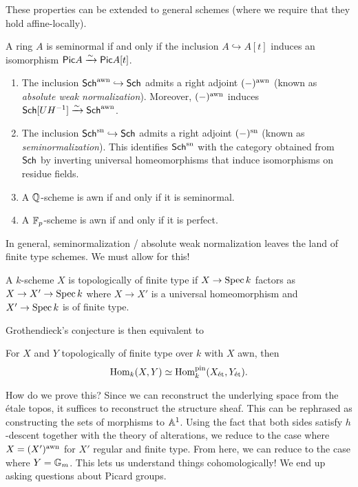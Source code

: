 \documentclass{amsart}
\begin{document}
These properties can be extended to general schemes (where we require that they hold affine-locally).

\begin{thm}
	A ring $A$ is seminormal if and only if the inclusion $A \hookrightarrow A[t]$ induces an isomorphism $\Pic A \xrightarrow{\sim} \Pic A[t]$.
\end{thm}

\begin{thm}
	\begin{enumerate}
		\item The inclusion $\Sch^\awn \hookrightarrow \Sch$ admits a right adjoint $(-)^\awn$ (known as \emph{absolute weak normalization}).
			Moreover, $(-)^\awn$ induces $\Sch[UH\inv] \xrightarrow{\sim} \Sch^\awn$.
		\item The inclusion $\Sch^\sn \hookrightarrow \Sch$ admits a right adjoint $(-)^\sn$ (known as \emph{seminormalization}).
			This identifies $\Sch^\sn$ with the category obtained from $\Sch$ by inverting universal homeomorphisms that induce isomorphisms on residue fields.
		\item A $\QQ$-scheme is awn if and only if it is seminormal.
		\item A $\FF_p$-scheme is awn if and only if it is perfect.
	\end{enumerate}
\end{thm}

In general, seminormalization / absolute weak normalization leaves the land of finite type schemes.
We must allow for this!

\begin{dfn}
	A $k$-scheme $X$ is topologically of finite type if $X \to \Spec k$ factors as $X \to X' \to \Spec k$ where $X \to X'$ is a universal homeomorphism and $X' \to \Spec k$ is of finite type.
\end{dfn}

Grothendieck's conjecture is then equivalent to

\begin{conj}
	For $X$ and $Y$ topologically of finite type over $k$ with $X$ awn, then
	\[
		\Hom_k(X, Y) \simeq \Hom_k^\pin(X_\et, Y_\et).
	\]
\end{conj}

How do we prove this?
Since we can reconstruct the underlying space from the \'etale topos, it suffices to reconstruct the structure sheaf.
This can be rephrased as constructing the sets of morphisms to $\AA^1$.
Using the fact that both sides satisfy $h$-descent together with the theory of alterations, we reduce to the case where $X = (X')^\awn$ for $X'$ regular and finite type.
From here, we can reduce to the case where $Y = \GG_m$.
This lets us understand things cohomologically!
We end up asking questions about Picard groups.
\end{document}
